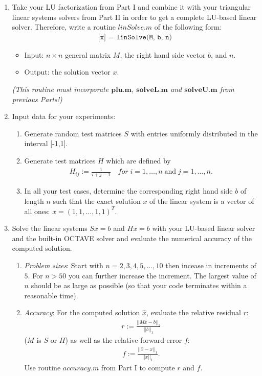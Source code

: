 \documentclass{scrartcl}
\begin{document}
    \begin{enumerate}
        \item Take your LU factorization from Part I and combine it with your triangular linear systems solvers from Part II in order to get a complete LU-based linear solver. Therefore, write a routine $linSolve.m$ of the following form: 
			\begin{align*}
				\texttt{[x] = linSolve(M, b, n)}
			\end{align*}
			\begin{itemize}
				\item Input: $n \times n$ general matrix $M$, the right hand side vector $b$, and $n$.
            	\item Output: the solution vector $x$.        	
        	\end{itemize}

\textit{(This routine must incorporate $\textbf{plu.m}$, $\textbf{solveL.m}$ and $\textbf{solveU.m}$ from previous Parts!)}        
        \item Input data for your experiments:
        \begin{enumerate}
            \item Generate random test matrices $S$ with entries uniformly distributed in the interval [-1,1].
            \item Generate test matrices $H$ which are defined by
            \begin{align*}
                H_{ij} := \frac{1}{i+j-1} \quad for \;i=1,\dots,n \; \mbox{and} \; j=1, \dots, n.
            \end{align*}
            \item In all your test cases, determine the corresponding right hand side $b$ of length $n$ such that the exact solution $x$ of the linear system is a vector of all ones: $x = (1, 1, \dots, 1, 1)^{T}$.
        \end{enumerate}
        \item Solve the linear systems $Sx = b$ and $Hx=b$ with your LU-based linear solver and the built-in OCTAVE solver and evaluate the numerical accuracy of the computed solution.
        \begin{enumerate}
            \item \textit{Problem sizes}: Start with $n=2,3,4,5,\dots,10$ then incease in increments of $5$. For $n > 50$ you can further increase the increment. The largest value of $n$ should be as large as possible (so that your code terminates within a reasonable time).
            \item \textit{Accuracy}: For the computed solution $\hat{x}$, evaluate the relative residual $r$:
            \begin{align*}
                r := \frac{||M\hat{x} - b||_1}{||b||_1}
            \end{align*}
            ($M$ is $S$ or $H$)
            as well as the relative forward error $f$:
            \begin{align*}
                f := \frac{||\hat{x} - x||_1}{||x||_1}. 
            \end{align*}
Use routine $accuracy.m$ from Part I to compute $r$ and $f$.
            

\end{enumerate}
\end{enumerate}
\end{document}
